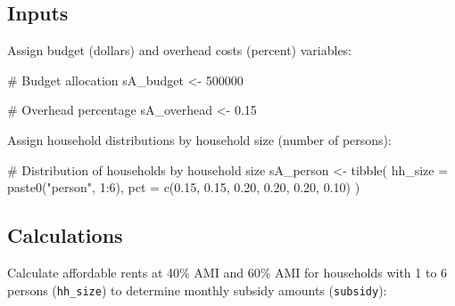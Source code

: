 \documentclass[
  10pt,
  letterpaper,
  DIV=11,
  numbers=noendperiod]{scrartcl}
\newenvironment{Shaded}{\begin{snugshade}}{\end{snugshade}}
\newcommand{\AttributeTok}[1]{\textcolor[rgb]{0.40,0.45,0.13}{#1}}
\newcommand{\CommentTok}[1]{\textcolor[rgb]{0.37,0.37,0.37}{#1}}
\newcommand{\DecValTok}[1]{\textcolor[rgb]{0.68,0.00,0.00}{#1}}
\newcommand{\FloatTok}[1]{\textcolor[rgb]{0.68,0.00,0.00}{#1}}
\newcommand{\FunctionTok}[1]{\textcolor[rgb]{0.28,0.35,0.67}{#1}}
\newcommand{\NormalTok}[1]{\textcolor[rgb]{0.00,0.23,0.31}{#1}}
\newcommand{\OtherTok}[1]{\textcolor[rgb]{0.00,0.23,0.31}{#1}}
\newcommand{\SpecialCharTok}[1]{\textcolor[rgb]{0.37,0.37,0.37}{#1}}
\newcommand{\StringTok}[1]{\textcolor[rgb]{0.13,0.47,0.30}{#1}}
\begin{document}
\newpage

\subsection{Inputs}\label{inputs}

Assign budget (dollars) and overhead costs (percent) variables:

\begin{Shaded}
\begin{Highlighting}[]
\CommentTok{\# Budget allocation}
\NormalTok{sA\_budget }\OtherTok{\textless{}{-}} \DecValTok{500000}

\CommentTok{\# Overhead percentage}
\NormalTok{sA\_overhead }\OtherTok{\textless{}{-}} \FloatTok{0.15}
\end{Highlighting}
\end{Shaded}

Assign household distributions by household size (number of persons):

\begin{Shaded}
\begin{Highlighting}[]
\CommentTok{\# Distribution of households by household size}
\NormalTok{sA\_person }\OtherTok{\textless{}{-}} \FunctionTok{tibble}\NormalTok{(}
  \AttributeTok{hh\_size =} \FunctionTok{paste0}\NormalTok{(}\StringTok{"person"}\NormalTok{, }\DecValTok{1}\SpecialCharTok{:}\DecValTok{6}\NormalTok{),}
  \AttributeTok{pct =} \FunctionTok{c}\NormalTok{(}\FloatTok{0.15}\NormalTok{, }\FloatTok{0.15}\NormalTok{, }\FloatTok{0.20}\NormalTok{, }\FloatTok{0.20}\NormalTok{, }\FloatTok{0.20}\NormalTok{, }\FloatTok{0.10}\NormalTok{)}
\NormalTok{)}
\end{Highlighting}
\end{Shaded}

\subsection{Calculations}\label{calculations}

Calculate affordable rents at 40\% AMI and 60\% AMI for households with
1 to 6 persons (\texttt{hh\_size}) to determine monthly subsidy amounts
(\texttt{subsidy}):
\end{document}
